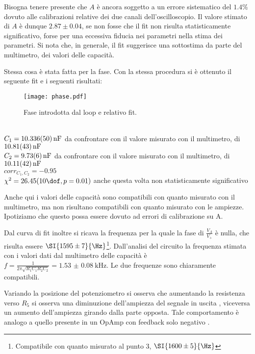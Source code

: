 Bisogna tenere presente che $A$ è ancora soggetto a un errore sistematico del $1.4 \%$ dovuto alle calibrazioni relative dei due canali dell'oscilloscopio. Il valore stimato di $A$ è dunque $2.87 \pm 0.04$, se non fosse che il fit non risulta statisticamente significativo, forse per una eccessiva fiducia nei parametri nella stima dei parametri.
Si nota che, in generale, il fit suggerisce una sottostima da parte del multimetro, dei  valori delle capacità.


Stessa cosa è stata fatta per la fase. Con la stessa procedura si è ottenuto il seguente fit e i seguenti risultati:
\begin{figure}[h]
	\centering
	\texttt{[image: phase.pdf]}
	\caption{Fase introdotta dal loop e relativo fit.}
	\label{f:lpfs}
\end{figure}
\\
$C_1=\SI{10.336 \pm 0.05}{nF}$ da confrontare con il valore misurato con il multimetro, di $\SI{10.81\pm 0.43}{nF}$\\
$C_2=\SI{9.73\pm 0.06}{nF}$ da confrontare con il valore misurato con il multimetro, di $\SI{10.11\pm 0.42}{nF}$\\
$corr_{C_1, C_2}=-0.95$\\
$\chi^2=26.45 (10 \dof, p = 0.01)$ anche questa volta non statisticamente significativo


Anche qui i valori delle capacità sono compatibili con quanto misurato con il multimetro, ma non risultano compatibili con quanto misurato con le ampiezze. Ipotiziamo che questo possa essere dovuto ad errori di calibrazione su A. %


Dal curva di fit inoltre si ricava la frequenza per la quale la fase di $\frac{V_A}{V_+}$ è nulla, che risulta essere $\SI{1595 \pm 7}{\Hz}$\footnote{Compatibile con quanto misurato al punto 3, $\SI{1600 \pm 5}{\Hz}$}.%
Dall'analisi del circuito la frequenza stimata con i valori dati dal multimetro delle capacità è $f=\frac{1}{2 \pi \sqrt{R_1C_1R_2C_2}}= \SI{1.53(8)}{\kHz}$. Le due frequenze sono chiaramente compatibili.


Variando la posizione del potenziometro si osserva che aumentando la resistenza verso $R_5$ si osserva una diminuzione dell'ampiezza del segnale in uscita , viceversa un aumento dell'ampiezza girando dalla parte opposta. Tale comportamento è analogo a quello presente in un OpAmp con feedback solo negativo .
